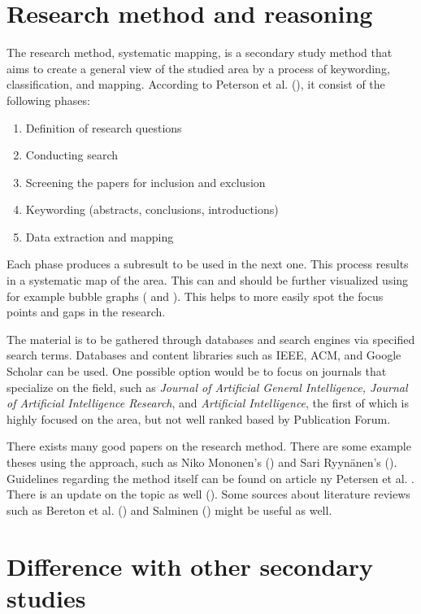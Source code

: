 \documentclass[utf8,english]{gradu3}
\begin{document}
\section{Research method and reasoning}

\label{method}
The research method, systematic mapping, is a secondary study method that aims to create a general view of the studied area by a process of keywording, classification, and mapping. According to Peterson et al. (\cite*{petersen2008}), it consist of the following phases:
\begin{enumerate}
    \item Definition of research questions
    \item Conducting search
    \item Screening the papers for inclusion and exclusion
    \item Keywording (abstracts, conclusions, introductions)
    \item Data extraction and mapping
\end{enumerate}

Each phase produces a subresult to be used in the next one. This process results in a systematic map of the area. This can and should be further visualized using for example bubble graphs (\cite{mononen2018} and \cite{petersen2008}). This helps to more easily spot the focus points and gaps in the research.


The material is to be gathered through databases and search engines via specified search terms. Databases and content libraries such as IEEE, ACM, and Google Scholar can be used. One possible option would be to focus on journals that specialize on the field, such as \textit{Journal of Artificial General Intelligence, Journal of Artificial Intelligence Research}, and \textit{Artificial Intelligence}, the first of which is highly focused on the area, but not well ranked based by Publication Forum. 

There exists many good papers on the research method. There are some example theses using the approach, such as Niko Mononen's (\cite{mononen2018}) and Sari Ryynänen's (\cite{ryynanen2017}). Guidelines regarding the method itself can be found on article ny Petersen et al. \cite*{petersen2008}. There is an update on the topic as well (\cite{petersen2015}). Some sources about literature reviews such as Bereton et al. (\cite*{brereton2007}) and Salminen (\cite*{salminen2011}) might be useful as well.

\section{Difference with other secondary studies}
\end{document}
